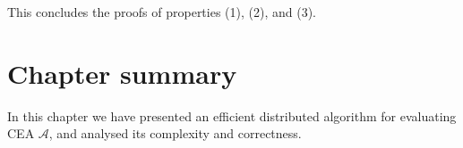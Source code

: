 This concludes the proofs of properties (1), (2), and (3).

\section{Chapter summary}

In this chapter we have presented an efficient distributed algorithm for evaluating CEA $\mathcal{A}$, and analysed its complexity and correctness.
